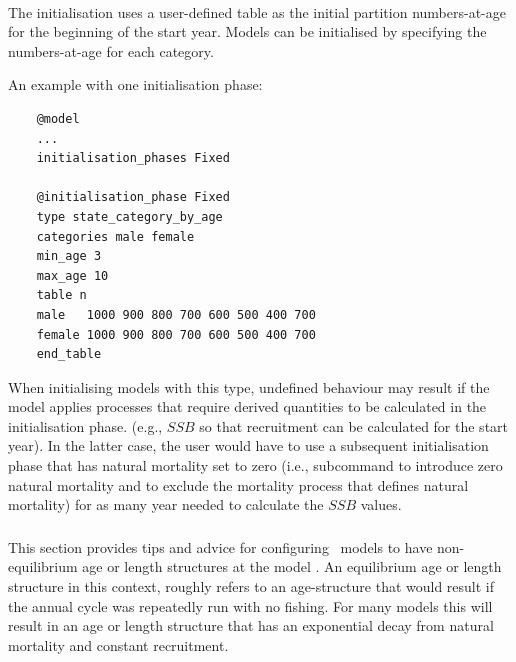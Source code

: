 \paragraph{}\label{sec:InitialisationPhase-StateCategoryByAge}\label{sec:Process-LoadPartition}

The  initialisation uses a user-defined table as the initial partition numbers-at-age for the beginning of the  start year. Models can be initialised by specifying the numbers-at-age for each category.

An example with one initialisation phase:

{\small{\begin{verbatim}
	@model
	...
	initialisation_phases Fixed

	@initialisation_phase Fixed
	type state_category_by_age
	categories male female
	min_age 3
	max_age 10
	table n
	male   1000 900 800 700 600 500 400 700
	female 1000 900 800 700 600 500 400 700
	end_table
\end{verbatim}}}

When initialising models with this type, undefined behaviour may result if the model applies processes that require derived quantities to be calculated in the initialisation phase. (e.g., $SSB$ so that recruitment can be calculated for the start year). In the latter case, the user would have to use a subsequent initialisation phase  that has natural mortality set to zero (i.e.,  subcommand to introduce zero natural mortality and  to exclude the mortality process that defines natural mortality) for as many year needed to calculate the $SSB$ values.

\subsubsection{}\label{sec:Initialisation-NonEquilibrium}

This section provides tips and advice for configuring \CNAME\ models to have non-equilibrium age or length structures at the model . An equilibrium age or length structure in this context, roughly refers to an age-structure that would result if the annual cycle was repeatedly run with no fishing. For many models this will result in an age or length structure that has an exponential decay from natural mortality and constant recruitment.

